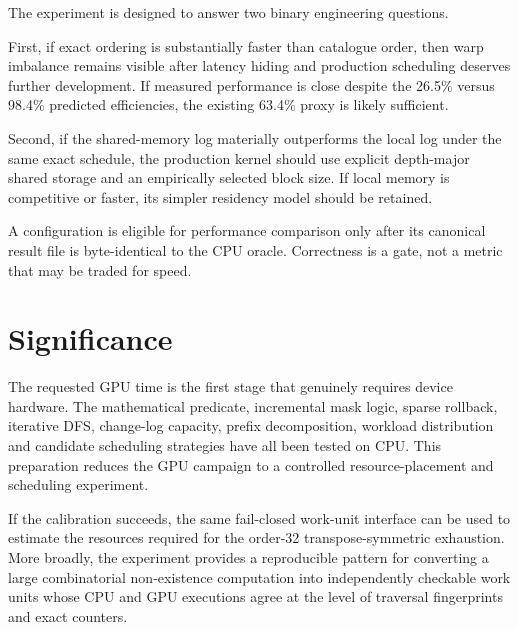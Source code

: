 \documentclass[11pt,a4paper]{article}
\begin{document}
The experiment is designed to answer two binary engineering questions.

First, if exact ordering is substantially faster than catalogue order, then warp imbalance remains visible after latency hiding and production scheduling deserves further development. If measured performance is close despite the 26.5\% versus 98.4\% predicted efficiencies, the existing 63.4\% proxy is likely sufficient.

Second, if the shared-memory log materially outperforms the local log under the same exact schedule, the production kernel should use explicit depth-major shared storage and an empirically selected block size. If local memory is competitive or faster, its simpler residency model should be retained.

A configuration is eligible for performance comparison only after its canonical result file is byte-identical to the CPU oracle. Correctness is a gate, not a metric that may be traded for speed.

\section{Significance}

The requested GPU time is the first stage that genuinely requires device hardware. The mathematical predicate, incremental mask logic, sparse rollback, iterative DFS, change-log capacity, prefix decomposition, workload distribution and candidate scheduling strategies have all been tested on CPU. This preparation reduces the GPU campaign to a controlled resource-placement and scheduling experiment.

If the calibration succeeds, the same fail-closed work-unit interface can be used to estimate the resources required for the order-32 transpose-symmetric exhaustion. More broadly, the experiment provides a reproducible pattern for converting a large combinatorial non-existence computation into independently checkable work units whose CPU and GPU executions agree at the level of traversal fingerprints and exact counters.
\end{document}
